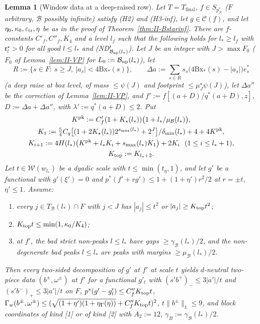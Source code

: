 \documentclass[10pt]{amsart}
\newtheorem{lemma}[theorem]{Lemma}
\theoremstyle{definition}
\theoremstyle{remark}
\newcommand{\Cset}{\mathcal C}
\begin{document}
\begin{lemma}[Window data at a deep-raised row]\label{lem:II-Winf}
Let $T=T_{\mathrm{final}}$, $f\in S_{p_N^*}$ \textup{(}$F$ arbitrary,
$\mathcal B$ possibly infinite\textup{)} satisfy \textup{(H2)} and
\textup{(H3-inf)}, let $g\in\Cset(f)$, and let $\eta_0,\kappa_0,
\varepsilon_{\rm tr},\eta$ be as in the proof of Theorem~\ref{thm:II-Bstarinf}.
There are $f$-constants $C'_f,C''_f,K_4$ and a level $l_f$ such that the
following holds for $l_*\ge l_f$ with $\mathfrak r^\star_l>0$ for all good
$l\le l_*$ and \textup{(ND$'_{\mathcal B_{\rm np}(l_*)}$)}.  Let $J$ be an
integer with $J>\max F_0$ \textup{(}$F_0$ of Lemma~\textup{\ref{lem:II-VP}} for
$L_0:=\mathcal B_{\rm np}(l_*)$\textup{)}, let
\[
 R:=\{s\in F:\ s\ge J,\ |a_s|<4\mathrm{Bx}_*(s)\},\qquad\Delta a:=\sum_{s\in
 R}s_s\big(4\mathrm{Bx}_*(s)-|a_s|\big)e^*_s
\]
\textup{(}a deep raise at box level, of mass $\le\psi(J)$ and footprint
$\le\mu^\star_J\psi(J)$\textup{)}, let $\Delta a''$ be the correction of
Lemma~\textup{\ref{lem:II-VP}}, and $f':=f[(a+D)/q^*(a+D),z]$,
$D:=\Delta a+\Delta a''$, with $\lambda':=q^*(a+D)\le2$.  Put
\begin{gather*}
 K^{\rm pk}:=C'_f(1+K_\star(l_*))\big(1+l_*/\mu_{\mathcal B}(l_*)\big),\\
 K_1:=\tfrac54C_q\big[(1+2K_\star(l_*))2^{s_{\max}(l_*)}+2^J\big]/
 \delta_{\min}(l_*)+4+4K^{\rm pk},\\
 K_{i+1}:=4H(l_*)\big(K^{\rm pk}+l_*K_i+s_{\max}(l_*)K_1\big)+2K_i\ \
 (1\le i\le l_*+1),\\ K_{\rm top}:=K_{l_*+2}.
\end{gather*}
Let $t\in\mathcal W(w_{l_*})$ be a dyadic scale with $t\le\min(t_\eta,1)$,
and let $g'$ be a functional with $g'(\xi')=0$ and $p^*(f'+rg')\le
1+(1+\eta')r^2/2$ at $r=\pm t$, $\eta'\le1$.  Assume:
\begin{enumerate}
\item[(S1)] every $j\in T_{\mathcal B}(l_*)\cap F$ with $j<J$ has $|a_j|\le
t^2$ or $|a_j|\ge K_{\rm top}t^2$;
\item[(S2)] $K_{\rm top}t\le\min(1,\kappa_0/K_4)$;
\item[(S3)] at $f'$, the bad strict non-peaks $l\le l_*$ have gaps
$\ge\gamma_{\mathcal B}(l_*)/2$, and the non-degenerate bad peaks $l\le l_*$
are peaks with margins $\ge\mu_{\mathcal B}(l_*)/2$.
\end{enumerate}
Then every two-sided decomposition of $g'$ at $f'$ at scale $t$ yields
$d$-neutral two-piece data $(b^\pm,\omega^\pm)$ at $f'$ for a functional
$g'_t$ with $(s'b^+)_-\le3|a'|/t$ and $(s'b^-)_+\le3|a'|/t$ on $F$,
$p^*(g'-g'_t)\le C''_fK_{\rm top}t$, $\Gamma_w(b^\pm,\omega^\pm)\le
(\sqrt{(1+\eta')(1+\eta_\Gamma(\eta))}+C''_fK_{\rm top}t)^2$, $t\|b^\pm\|_1\le9$, and
block coordinates of kind \textup{[1]} or of kind \textup{[2]} with
$A_2:=12$, $\gamma_B:=\gamma_{\mathcal B}(l_*)/2$.
\end{lemma}
\end{document}
